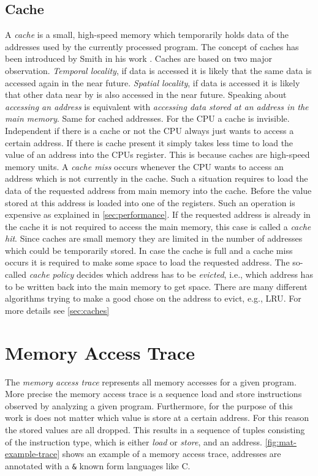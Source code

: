 \documentclass[onecolumn, openany, master, english, seal, signatures]{dbrgrptt}
\begin{document}
\subsection{Cache}
A \emph{cache} is a small, high-speed memory which temporarily holds data of the addresses used by the currently processed program. The concept of caches has been introduced by Smith in his work \cite{smith1982cache}.
Caches are based on two major observation. \emph{Temporal locality}, if data is accessed it is likely that the same data is accessed again in the near future. \emph{Spatial locality}, if data is accessed it is likely that other data near by is also accessed in the near future. Speaking about \emph{accessing an address} is equivalent with \emph{accessing data stored at an address in the main memory}. Same for cached addresses.
For the \ac{CPU} a cache is invisible. Independent if there is a cache or not the \ac{CPU} always just wants to access a certain address. If there is cache present it simply takes less time to load the value of an address into the \ac{CPU}s register. This is because caches are high-speed memory units.
A \emph{cache miss} occurs whenever the CPU wants to access an address which is not currently in the cache. Such a situation requires to load the data of the requested address from main memory into the cache. Before the value stored at this address is loaded into one of the registers. Such an operation is expensive as explained in \autoref{sec:performance}. If the requested address is already in the cache it is not required to access the main memory, this case is called a \emph{cache hit}. Since caches are small memory they are limited in the number of addresses which could be temporarily stored. In case the cache is full and a cache miss occurs it is required to make some space to load the requested address. The so-called \emph{cache policy} decides which address has to be \emph{evicted}, i.e., which address has to be written back into the main memory to get space. There are many different algorithms trying to make a good chose on the address to evict, e.g., \ac{LRU}. For more details see \autoref{sec:caches}

\section{Memory Access Trace}\label{sec:memory-access-trace}

The \emph{memory access trace} represents all memory accesses for a given program. More precise the memory access trace is a sequence load and store instructions observed by analyzing a given program. Furthermore, for the purpose of this work is does not matter which value is store at a certain address. For this reason the stored values are all dropped. This results in a sequence of tuples consisting of the instruction type, which is either \emph{load} or \emph{store}, and an address. \autoref{fig:mat-example-trace} shows an example of a memory access trace, addresses are annotated with a \texttt{\&} known form languages like C.
\end{document}
